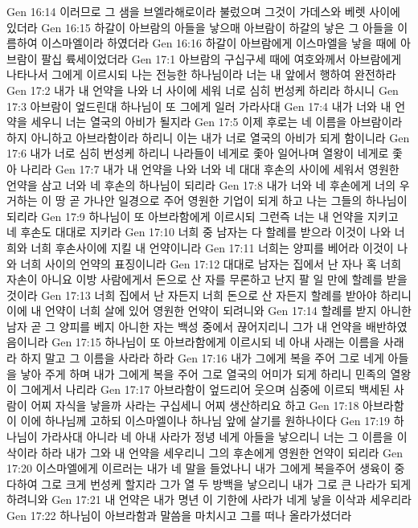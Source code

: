 Gen 16:14  이러므로 그 샘을 브엘라해로이라 불렀으며 그것이 가데스와 베렛 사이에 있더라
Gen 16:15  하갈이 아브람의 아들을 낳으매 아브람이 하갈의 낳은 그 아들을 이름하여 이스마엘이라 하였더라
Gen 16:16  하갈이 아브람에게 이스마엘을 낳을 때에 아브람이 팔십 륙세이었더라
Gen 17:1  아브람의 구십구세 때에 여호와께서 아브람에게 나타나서 그에게 이르시되 나는 전능한 하나님이라 너는 내 앞에서 행하여 완전하라
Gen 17:2  내가 내 언약을 나와 너 사이에 세워 너로 심히 번성케 하리라 하시니
Gen 17:3  아브람이 엎드린대 하나님이 또 그에게 일러 가라사대
Gen 17:4  내가 너와 내 언약을 세우니 너는 열국의 아비가 될지라
Gen 17:5  이제 후로는 네 이름을 아브람이라 하지 아니하고 아브라함이라 하리니 이는 내가 너로 열국의 아비가 되게 함이니라
Gen 17:6  내가 너로 심히 번성케 하리니 나라들이 네게로 좇아 일어나며 열왕이 네게로 좇아 나리라
Gen 17:7  내가 내 언약을 나와 너와 네 대대 후손의 사이에 세워서 영원한 언약을 삼고 너와 네 후손의 하나님이 되리라
Gen 17:8  내가 너와 네 후손에게 너의 우거하는 이 땅 곧 가나안 일경으로 주어 영원한 기업이 되게 하고 나는 그들의 하나님이 되리라
Gen 17:9  하나님이 또 아브라함에게 이르시되 그런즉 너는 내 언약을 지키고 네 후손도 대대로 지키라
Gen 17:10  너희 중 남자는 다 할례를 받으라 이것이 나와 너희와 너희 후손사이에 지킬 내 언약이니라
Gen 17:11  너희는 양피를 베어라 이것이 나와 너희 사이의 언약의 표징이니라
Gen 17:12  대대로 남자는 집에서 난 자나 혹 너희 자손이 아니요 이방 사람에게서 돈으로 산 자를 무론하고 난지 팔 일 만에 할례를 받을 것이라
Gen 17:13  너희 집에서 난 자든지 너희 돈으로 산 자든지 할례를 받아야 하리니 이에 내 언약이 너희 살에 있어 영원한 언약이 되려니와
Gen 17:14  할례를 받지 아니한 남자 곧 그 양피를 베지 아니한 자는 백성 중에서 끊어지리니 그가 내 언약을 배반하였음이니라
Gen 17:15  하나님이 또 아브라함에게 이르시되 네 아내 사래는 이름을 사래라 하지 말고 그 이름을 사라라 하라
Gen 17:16  내가 그에게 복을 주어 그로 네게 아들을 낳아 주게 하며 내가 그에게 복을 주어 그로 열국의 어미가 되게 하리니 민족의 열왕이 그에게서 나리라
Gen 17:17  아브라함이 엎드리어 웃으며 심중에 이르되 백세된 사람이 어찌 자식을 낳을까 사라는 구십세니 어찌 생산하리요 하고
Gen 17:18  아브라함이 이에 하나님께 고하되 이스마엘이나 하나님 앞에 살기를 원하나이다
Gen 17:19  하나님이 가라사대 아니라 네 아내 사라가 정녕 네게 아들을 낳으리니 너는 그 이름을 이삭이라 하라 내가 그와 내 언약을 세우리니 그의 후손에게 영원한 언약이 되리라
Gen 17:20  이스마엘에게 이르러는 내가 네 말을 들었나니 내가 그에게 복을주어 생육이 중다하여 그로 크게 번성케 할지라 그가 열 두 방백을 낳으리니 내가 그로 큰 나라가 되게 하려니와
Gen 17:21  내 언약은 내가 명년 이 기한에 사라가 네게 낳을 이삭과 세우리라
Gen 17:22  하나님이 아브라함과 말씀을 마치시고 그를 떠나 올라가셨더라
